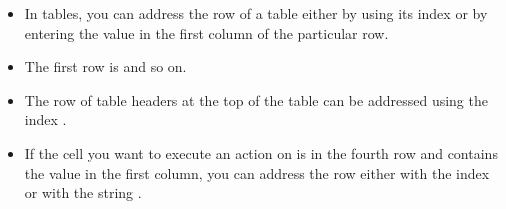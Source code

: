 \begin{itemize}
\item In tables, you can address the row of a table either by using its index or by entering the value in the first column of the particular row. 
\item The first row is  and so on.
\item The row of table headers at the top of the table can be addressed using the index . 
\item If the cell you want to execute an action on is in the fourth row and  contains the value  in the first column, you can address the row  either with the index  or with the string .  
\end{itemize}    
